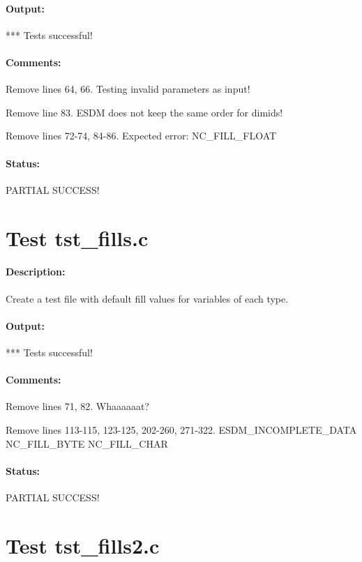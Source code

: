 \paragraph{Output:} *** Tests successful!

\paragraph{Comments:} Remove lines 64, 66. Testing invalid parameters as input!

Remove line 83. ESDM does not keep the same order for dimids!

Remove lines 72-74, 84-86. Expected error: NC\_FILL\_FLOAT

\paragraph{Status:} PARTIAL SUCCESS!

\section{Test tst\_fills.c}

\paragraph{Description:} Create a test file with default fill values for variables of each type.

\paragraph{Output:} *** Tests successful!

\paragraph{Comments:} Remove lines 71, 82. Whaaaaaat?

Remove lines 113-115, 123-125, 202-260, 271-322. ESDM\_INCOMPLETE\_DATA NC\_FILL\_BYTE NC\_FILL\_CHAR

\paragraph{Status:} PARTIAL SUCCESS!

{\color{blue}{Help, Julian!}}

\section{Test tst\_fills2.c}

